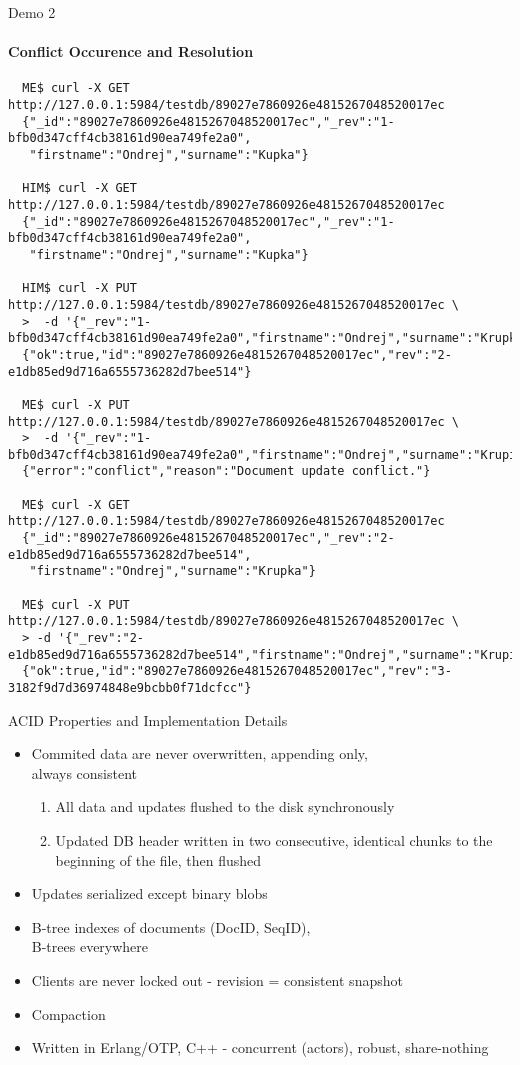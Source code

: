 \documentclass{beamer}
\begin{document}
\begin{frame}[fragile]{Demo 2}
  \framesubtitle{Conflict Occurence and Resolution}
  \fontsize{6}{8}\selectfont
  \begin{verbatim}
  ME$ curl -X GET http://127.0.0.1:5984/testdb/89027e7860926e4815267048520017ec
  {"_id":"89027e7860926e4815267048520017ec","_rev":"1-bfb0d347cff4cb38161d90ea749fe2a0",
   "firstname":"Ondrej","surname":"Kupka"}

  HIM$ curl -X GET http://127.0.0.1:5984/testdb/89027e7860926e4815267048520017ec
  {"_id":"89027e7860926e4815267048520017ec","_rev":"1-bfb0d347cff4cb38161d90ea749fe2a0",
   "firstname":"Ondrej","surname":"Kupka"}

  HIM$ curl -X PUT http://127.0.0.1:5984/testdb/89027e7860926e4815267048520017ec \
  >  -d '{"_rev":"1-bfb0d347cff4cb38161d90ea749fe2a0","firstname":"Ondrej","surname":"Krupka"}'
  {"ok":true,"id":"89027e7860926e4815267048520017ec","rev":"2-e1db85ed9d716a6555736282d7bee514"}

  ME$ curl -X PUT http://127.0.0.1:5984/testdb/89027e7860926e4815267048520017ec \
  >  -d '{"_rev":"1-bfb0d347cff4cb38161d90ea749fe2a0","firstname":"Ondrej","surname":"Krupicka"}'
  {"error":"conflict","reason":"Document update conflict."}

  ME$ curl -X GET http://127.0.0.1:5984/testdb/89027e7860926e4815267048520017ec
  {"_id":"89027e7860926e4815267048520017ec","_rev":"2-e1db85ed9d716a6555736282d7bee514",
   "firstname":"Ondrej","surname":"Krupka"}

  ME$ curl -X PUT http://127.0.0.1:5984/testdb/89027e7860926e4815267048520017ec \
  > -d '{"_rev":"2-e1db85ed9d716a6555736282d7bee514","firstname":"Ondrej","surname":"Krupicka"}'
  {"ok":true,"id":"89027e7860926e4815267048520017ec","rev":"3-3182f9d7d36974848e9bcbb0f71dcfcc"}
  \end{verbatim}
\end{frame}

\begin{frame}{ACID Properties and Implementation Details}
  \begin{itemize}
    \item Commited data are never overwritten, appending only,\\always consistent
    \begin{enumerate}
      \item All data and updates flushed to the disk synchronously
      \item Updated DB header written in two consecutive, identical chunks
            to the beginning of the file, then flushed
    \end{enumerate}
    \item Updates serialized except binary blobs
    \item B-tree indexes of documents (DocID, SeqID),\\B-trees everywhere
    \item Clients are never locked out - revision = consistent snapshot
    \item Compaction
    \item Written in Erlang/OTP, C++ - concurrent (actors), robust, share-nothing
  \end{itemize}
\end{frame}
\end{document}
